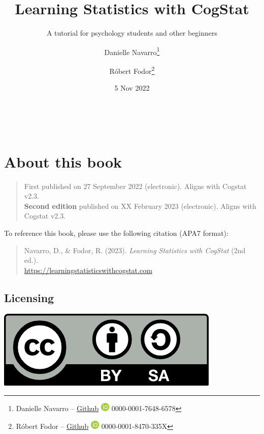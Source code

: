 \documentclass[
  11pt,
  a4paper,
  twoside,symmetric,openright]{book}
\title{Learning Statistics with CogStat}
\subtitle{A tutorial for psychology students and other beginners}
\author{Danielle Navarro\footnote{Danielle Navarro -- \href{https://github.com/djnavarro/}{Github} \textbar{} \href{https://orcid.org/0000-0001-7648-6578}{\includegraphics{resources/image/orcid_16x16.png}} 0000-0001-7648-6578} \and Róbert Fodor\footnote{Róbert Fodor -- \href{https://github.com/robertfodor/}{Github} \textbar{} \href{https://orcid.org/0000-0001-8470-335X}{\includegraphics{resources/image/orcid_16x16.png}} 0000-0001-8470-335X}}
\date{5 Nov 2022}
\theoremstyle{break}
\theoremstyle{break}
\let\oldmaketitle\maketitle
\begin{document}
\maketitle

\frontmatter
{} %

\let\maketitle\oldmaketitle
\maketitle
\
\newpage

\mainmatter
{}

{
\hypersetup{linkcolor=black}
\setcounter{tocdepth}{1}
\tableofcontents
}
\hypertarget{about-this-book}{%
\chapter*{About this book}\label{about-this-book}}

\begin{quote}
First published on 27 September 2022 (electronic). Aligns with Cogstat v2.3.\\
\textbf{Second edition} published on XX February 2023 (electronic). Aligns with Cogstat v2.3.
\end{quote}

To reference this book, please use the following citation (APA7 format):

\begin{quote}
Navarro, D., \& Fodor, R. (2023). \emph{Learning Statistics with CogStat} (2nd ed.).\\
\url{https://learningstatisticswithcogstat.com}
\end{quote}

\hypertarget{licensing}{%
\section*{Licensing}\label{licensing}}

\includegraphics[width=0.15\linewidth]{resources/image/by-sa}
\end{document}
